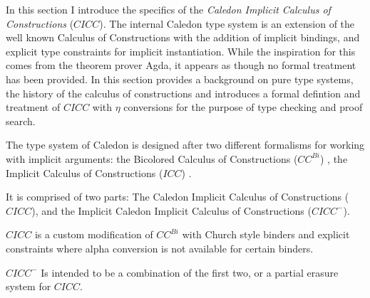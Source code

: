 In this section I introduce the specifics of the \textit{Caledon Implicit Calculus of Constructions} ($CICC$).
The internal Caledon type system is an extension of the well known Calculus of Constructions with the 
addition of implicit bindings, and explicit type constraints for implicit instantiation.  
While the inspiration for this comes from the theorem prover Agda, it appears as though no formal treatment
has been provided. In this section provides a background on pure type systems, the history of the calculus of constructions
and introduces a formal defintion and treatment of $CICC$ with $\eta$ conversions for the purpose of type checking
and proof search.

The type system of Caledon is designed after two different formalisms for working with implicit arguments:  
the Bicolored Calculus of Constructions ($CC^{Bi}$) \citep{luther2001more}, 
the Implicit Calculus of Constructions ($ICC$) \citep{miquel2001implicit}.

It is comprised of two parts: The Caledon Implicit Calculus of Constructions ($CICC$), 
and the Implicit Caledon Implicit Calculus of Constructions ($CICC^-$).

$CICC$ is a custom modification of $CC^{Bi}$ with Church style binders and explicit constraints 
where alpha conversion is not available for certain binders.

$CICC^-$ Is intended to be a combination of the first two, or a partial 
erasure system for $CICC$. 

